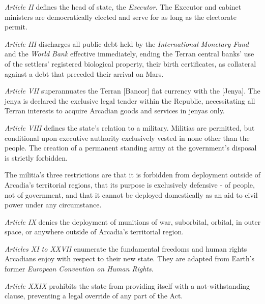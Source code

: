 \item {\it Article II} defines the head of state, the {\it Executor}. The Executor and cabinet ministers are democratically elected and serve for as long as the electorate permit.

\item {\it Article III} discharges all public debt held by the {\it International Monetary Fund} and the {\it World Bank} effective immediately, ending the Terran central banks' use of the settlers' registered biological property, their birth certificates, as collateral against a debt that preceded their arrival on Mars.

\item {\it Article VII} superannuates the Terran [Bancor] fiat currency with the [Jenya]. The jenya is declared the exclusive legal tender within the Republic, necessitating all Terran interests to acquire Arcadian goods and services in jenyas only.

\item {\it Article VIII} defines the state's relation to a military. Militias are permitted, but conditional upon executive authority exclusively vested in none other than the people. The creation of a permanent standing army at the government's disposal is strictly forbidden.

The militia's three restrictions are that it is forbidden from deployment outside of Arcadia's territorial regions, that its purpose is exclusively defensive - of people, not of government, and that it cannot be deployed domestically as an aid to civil power under any circumstance.

\item {\it Article IX} denies the deployment of munitions of war, suborbital, orbital, in outer space, or anywhere outside of Arcadia's territorial region.

\item {\it Articles XI to XXVII} enumerate the fundamental freedoms and human rights Arcadians enjoy with respect to their new state. They are adapted from Earth's former {\it European Convention on Human Rights}.

\item {\it Article XXIX} prohibits the state from providing itself with a not-withstanding clause, preventing a legal override of any part of the Act.
\stopitemize
\stopTimelineDocument

